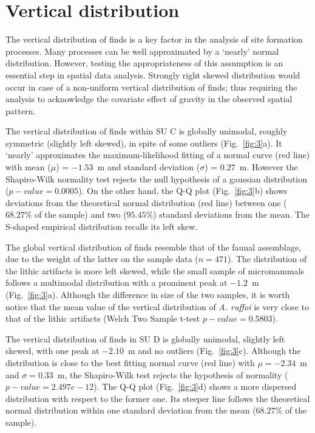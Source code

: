 \documentclass[review,authoryear]{elsarticle} %
\begin{document}
\section{Vertical distribution}

The vertical distribution of finds is a key factor in the analysis of site formation processes. Many processes can be well approximated by a ‘nearly’ normal distribution. However, testing the appropriateness of this assumption is an essential step in spatial data analysis. Strongly right skewed distribution would occur in case of a non-uniform vertical distribution of finds; thus requiring the analysis to acknowledge the covariate effect of gravity in the observed spatial pattern.

The vertical distribution of finds within SU C is globally unimodal, roughly symmetric (slightly left skewed), in spite of some outliers (Fig.~\ref{fig:3}a). It ‘nearly’ approximates the maximum-likelihood fitting of a normal curve (red line) with mean ($\mu$) = $-1.53$~m and standard deviation ($\sigma$) = $0.27$~m. However the Shapiro-Wilk normality test rejects the null hypothesis of a gaussian distribution ($p-value=0.0005$). On the other hand, the Q-Q plot (Fig.~\ref{fig:3}b) shows deviations from the theoretical normal distribution (red line) between one ($68.27\%$ of the sample) and two ($95.45\%$) standard deviations from the mean. The S-shaped empirical distribution recalls its left skew.

The global vertical distribution of finds resemble that of the faunal assemblage, due to the weight of the latter on the sample data ($n=471$). The distribution of the lithic artifacts is more left skewed, while the small sample of micromammals follows a multimodal distribution with a prominent peak at $-1.2$~m (Fig.~\ref{fig:3}a). Although the difference in size of the two samples, it is worth notice that the mean value of the vertical distribution of \emph{A. ruffoi} is very close to that of the lithic artifacts (Welch Two Sample t-test $p-value=0.5803$).

The vertical distribution of finds in SU D is globally unimodal, slightly left skewed, with one peak at $-2.10$~m and no outliers (Fig.~\ref{fig:3}c). Although the distribution is close to the best fitting normal curve (red line) with $\mu=-2.34$~m and $\sigma=0.33$~m, the Shapiro-Wilk test rejects the hypothesis of normality ($p-value=2.497e-12$). The Q-Q plot (Fig.~\ref{fig:3}d) shows a more dispersed distribution with respect to the former one. Its steeper line follows the theoretical normal distribution within one standard deviation from the mean ($68.27\%$ of the sample).
\end{document}
